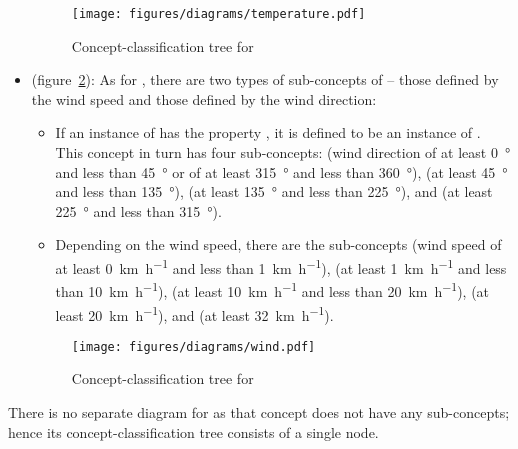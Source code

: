 \begin{itemize}
  \begin{figure}
    \centering
    \texttt{[image: figures/diagrams/temperature.pdf]}
    \caption{Concept-classification tree for }
    \label{fig:tree_temperature}
  \end{figure}

  \item {} (figure~\ref{fig:tree_wind}): As for , there are two types of sub-concepts of  -- those defined by the wind speed and those defined by the wind direction:
    \begin{itemize}
      \item If an instance of  has the property , it is defined to be an instance of . This concept in turn has four sub-concepts:  (wind direction of at least \SI{0}{\degree} and less than \SI{45}{\degree} or of at least \SI{315}{\degree} and less than \SI{360}{\degree}),  (at least \SI{45}{\degree} and less than \SI{135}{\degree}),  (at least \SI{135}{\degree} and less than \SI{225}{\degree}), and  (at least \SI{225}{\degree} and less than \SI{315}{\degree}).
      
      \item Depending on the wind speed, there are the sub-concepts  (wind speed of at least \SI{0}{\kilo\metre\per\hour} and less than \SI{1}{\kilo\metre\per\hour}),  (at least \SI{1}{\kilo\metre\per\hour} and less than \SI{10}{\kilo\metre\per\hour}),  (at least \SI{10}{\kilo\metre\per\hour} and less than \SI{20}{\kilo\metre\per\hour}),  (at least \SI{20}{\kilo\metre\per\hour}), and  (at least \SI{32}{\kilo\metre\per\hour}).
      
    \end{itemize}
    
  \begin{figure}
    \centering
    \texttt{[image: figures/diagrams/wind.pdf]}
    \caption{Concept-classification tree for }
    \label{fig:tree_wind}
  \end{figure}

\end{itemize}

There is no separate diagram for  as that concept does not have any sub-concepts; hence its concept-classification tree consists of a single node.

